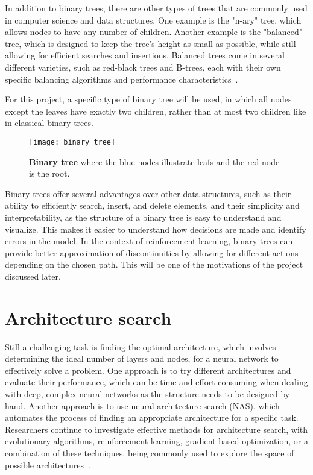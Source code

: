 In addition to binary trees, there are other types of trees that are commonly used in computer science and data structures. One example is the "n-ary" tree, which allows nodes to have any number of children. Another example is the "balanced" tree, which is designed to keep the tree's height as small as possible, while still allowing for efficient searches and insertions. Balanced trees come in several different varieties, such as red-black trees and B-trees, each with their own specific balancing algorithms and performance characteristics~\cite{goodrich_data_2013}.

For this project, a specific type of binary tree will be used, in which all nodes except the leaves have exactly two children, rather than at most two children like in classical binary trees.

\begin{figure}[!ht]
\centering
\texttt{[image: binary\_tree]}
\caption[Binary tree representation]{
  \textbf{Binary tree} where the blue nodes illustrate leafs and the red node is the root.
  }
\label{fig:binary_tree}
\end{figure}

Binary trees offer several advantages over other data structures, such as their ability to efficiently search, insert, and delete elements, and their simplicity and interpretability, as the structure of a binary tree is easy to understand and visualize. This makes it easier to understand how decisions are made and identify errors in the model. In the context of reinforcement learning, binary trees can provide better approximation of discontinuities by allowing for different actions depending on the chosen path. This will be one of the motivations of the project discussed later.

\section{Architecture search}

Still a challenging task is finding the optimal architecture, which involves determining the ideal number of layers and nodes, for a neural network to effectively solve a problem. One approach is to try different architectures and evaluate their performance, which can be time and effort consuming when dealing with deep, complex neural networks as the structure needs to be designed by hand. Another approach is to use neural architecture search (NAS), which automates the process of finding an appropriate architecture for a specific task. Researchers continue to investigate effective methods for architecture search, with evolutionary algorithms, reinforcement learning, gradient-based optimization, or a combination of these techniques, being commonly used to explore the space of possible architectures~\cite{elsken_neural_2019}.

